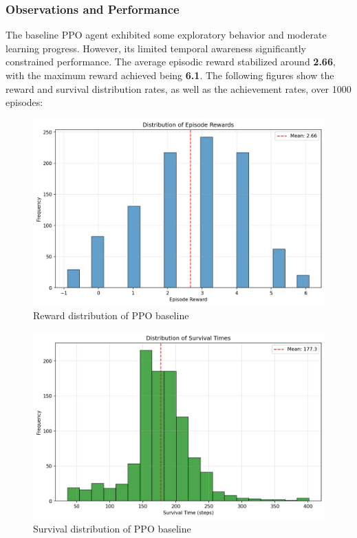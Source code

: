 \documentclass[twocolumn]{article}
\begin{document}
\subsubsection*{Observations and Performance}
The baseline PPO agent exhibited some exploratory behavior and moderate learning progress. However, its limited temporal awareness significantly constrained performance. The average episodic reward stabilized around \textbf{2.66}, with the maximum reward achieved being \textbf{6.1}.
The following figures show the reward and survival distribution rates, as well as the achievement rates, over 1000 episodes:
\begin{figure}[H]
    \centering
    \includegraphics[width=0.75\linewidth]{images/reward_distribution_ppo_baseline_1000_episodes.png}
    \caption{Reward distribution of PPO baseline}
    \label{fig:placeholder}
\end{figure}
\begin{figure}[H]
    \centering
    \includegraphics[width=0.75\linewidth]{images/survival_distribution_ppo_baseline_1000_episodes.png}
    \caption{Survival distribution of PPO baseline}
    \label{fig:placeholder}
\end{figure}
\end{document}
